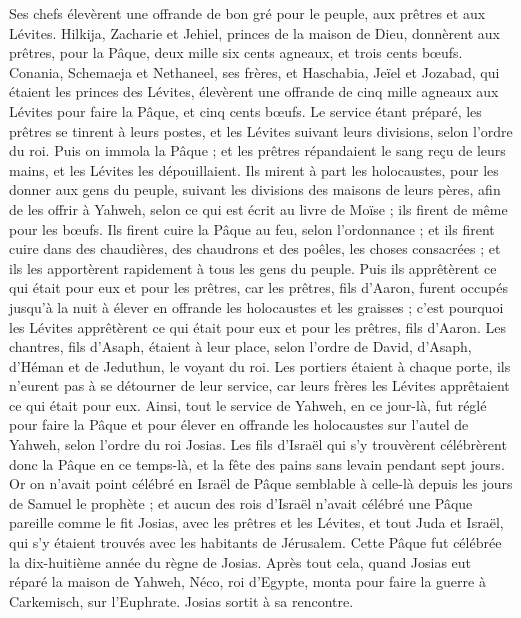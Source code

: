 \begin{multicols}{2}
Ses chefs élevèrent une offrande de bon gré pour le peuple, aux prêtres et aux Lévites. Hilkija, Zacharie et Jehiel, princes de la maison de Dieu, donnèrent aux prêtres, pour la Pâque, deux mille six cents agneaux, et trois cents bœufs.
Conania, Schemaeja et Nethaneel, ses frères, et Haschabia, Jeïel et Jozabad, qui étaient les princes des Lévites, élevèrent une offrande de cinq mille agneaux aux Lévites pour faire la Pâque, et cinq cents bœufs.
Le service étant préparé, les prêtres se tinrent à leurs postes, et les Lévites suivant leurs divisions, selon l'ordre du roi.
Puis on immola la Pâque ; et les prêtres répandaient le sang reçu de leurs mains, et les Lévites les dépouillaient.
Ils mirent à part les holocaustes, pour les donner aux gens du peuple, suivant les divisions des maisons de leurs pères, afin de les offrir à Yahweh, selon ce qui est écrit au livre de Moïse ; ils firent de même pour les bœufs.
Ils firent cuire la Pâque au feu, selon l'ordonnance ; et ils firent cuire dans des chaudières, des chaudrons et des poêles, les choses consacrées ; et ils les apportèrent rapidement à tous les gens du peuple.
Puis ils apprêtèrent ce qui était pour eux et pour les prêtres, car les prêtres, fils d'Aaron, furent occupés jusqu'à la nuit à élever en offrande les holocaustes et les graisses ; c'est pourquoi les Lévites apprêtèrent ce qui était pour eux et pour les prêtres, fils d'Aaron.
Les chantres, fils d'Asaph, étaient à leur place, selon l'ordre de David, d'Asaph, d'Héman et de Jeduthun, le voyant du roi. Les portiers étaient à chaque porte, ils n'eurent pas à se détourner de leur service, car leurs frères les Lévites apprêtaient ce qui était pour eux.
Ainsi, tout le service de Yahweh, en ce jour-là, fut réglé pour faire la Pâque et pour élever en offrande les holocaustes sur l'autel de Yahweh, selon l'ordre du roi Josias.
Les fils d'Israël qui s'y trouvèrent célébrèrent donc la Pâque en ce temps-là, et la fête des pains sans levain pendant sept jours.
Or on n'avait point célébré en Israël de Pâque semblable à celle-là depuis les jours de Samuel le prophète ; et aucun des rois d'Israël n'avait célébré une Pâque pareille comme le fit Josias, avec les prêtres et les Lévites, et tout Juda et Israël, qui s'y étaient trouvés avec les habitants de Jérusalem.
Cette Pâque fut célébrée la dix-huitième année du règne de Josias.
Après tout cela, quand Josias eut réparé la maison de Yahweh, Néco, roi d'Egypte, monta pour faire la guerre à Carkemisch, sur l'Euphrate. Josias sortit à sa rencontre.

\end{multicols}

